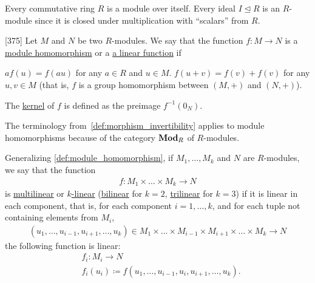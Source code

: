 \begin{example}\label{ex:module/ideal}
  Every commutative ring $R$ is a module over itself. Every ideal $I \unlhd R$ is an $R$-module since it is closed under multiplication with \enquote{scalars} from $R$.
\end{example}

\begin{definition}\label{def:module_homomorphism}\cite{Knapp2016BAlg}[375]
  Let $M$ and $N$ be two $R$-modules. We say that the function $f: M \to N$ is a \ul{module homomorphism} or a \ul{a linear function} if
  \begin{description}
     $a f(u) = f(a u)$ for any $a \in R$ and $u \in M$.
     $f(u + v) = f(v) + f(v)$ for any $u, v \in M$ (that is, $f$ is a group homomorphism between $(M, +)$ and $(N, +)$).
  \end{description}

  The \ul{kernel} of $f$ is defined as the preimage $f^{-1}(0_N)$.

  The terminology from~\cref{def:morphism_invertibility} applies to module homomorphisms because of the category $\operatorname{\mathbf{Mod}}_R$ of $R$-modules.
\end{definition}

\begin{definition}\label{def:multilinear_function}
  Generalizing \cref{def:module_homomorphism}, if $M_1, \ldots, M_k$ and $N$ are $R$-modules, we say that the function
  \begin{align*}
    f: M_1 \times \ldots \times M_k \to N
  \end{align*}
  is \ul{multilinear} or \ul{$k$-linear} (\ul{bilinear} for $k = 2$, \ul{trilinear} for $k = 3$) if it is linear in each component, that is, for each component $i = 1, \ldots, k$, and for each tuple not containing elements from $M_i$,
  \begin{align*}
    (u_1, \ldots, u_{i-1}, u_{i+1}, \ldots, u_k) \in M_1 \times \ldots \times M_{i-1} \times M_{i+1} \times \ldots \times M_k \to N
  \end{align*}
  the following function is linear:
  \begin{align*}
    &f_i: M_i \to N \\
    &f_i(u_i) \coloneqq f(u_1, \ldots, u_{i-1}, u_i, u_{i+1}, \ldots, u_k).
  \end{align*}
\end{definition}

